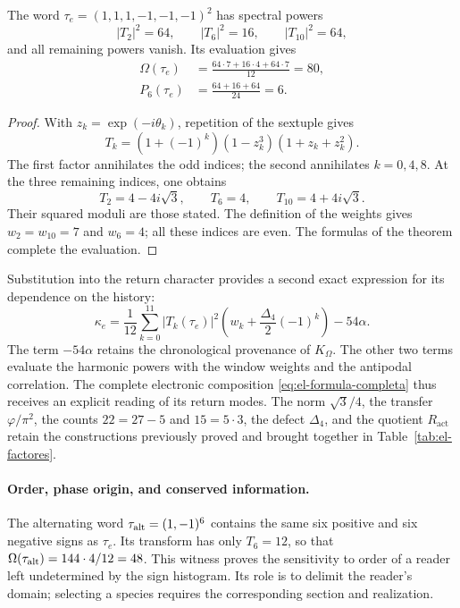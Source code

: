 \begin{corollary}
\label{cor:el-tres-modos}
The word \(\tau_e=(1,1,1,-1,-1,-1)^2\) has spectral
powers
\begin{equation}
 |T_2|^2=64,\qquad |T_6|^2=16,\qquad |T_{10}|^2=64,
 \label{eq:el-potencias-espectrales}
\end{equation}
and all remaining powers vanish. Its evaluation gives
\begin{equation}
 \begin{aligned}
 \Omega(\tau_e)&=\frac{64\cdot7+16\cdot4+64\cdot7}{12}=80,\\
 P_6(\tau_e)&=\frac{64+16+64}{24}=6.
 \end{aligned}
 \label{eq:el-evaluacion-espectral}
\end{equation}
\end{corollary}
\begin{proof}
With \(z_k=\exp(-i\theta_k)\), repetition of the sextuple gives
\[
 T_k=(1+(-1)^k)(1-z_k^3)(1+z_k+z_k^2).
\]
The first factor annihilates the odd indices; the second annihilates
\(k=0,4,8\). At the three remaining indices, one obtains
\[
 T_2=4-4i\sqrt3,\qquad T_6=4,\qquad T_{10}=4+4i\sqrt3.
\]
Their squared moduli are those stated. The definition of the
weights gives \(w_2=w_{10}=7\) and \(w_6=4\); all these indices are
even. The formulas of the theorem complete the evaluation.
\end{proof}

Substitution into the return character provides a second
exact expression for its dependence on the history:
\begin{equation}
 \kappa_e=
 \frac1{12}\sum_{k=0}^{11}|T_k(\tau_e)|^2
       \left(w_k+\frac{\Delta_4}{2}(-1)^k\right)-54\alpha.
 \label{eq:el-kappa-espectral}
\end{equation}
The term \(-54\alpha\) retains the chronological provenance
of \(K_\Omega\). The other two terms evaluate the harmonic
powers with the window weights and the antipodal
correlation. The complete electronic composition
\eqref{eq:el-formula-completa} thus receives an explicit reading
of its return modes. The norm \(\sqrt3/4\), the transfer
\(\varphi/\pi^2\), the counts \(22=27-5\) and \(15=5\cdot3\),
the defect \(\Delta_4\), and the quotient \(R_{\mathrm{act}}\)
retain the constructions previously proved and brought together in
Table~\ref{tab:el-factores}.

\paragraph{Order, phase origin, and conserved information.}
The alternating word \(\tau_{\rm alt}=(1,-1)^6\) contains the
same six positive and six negative signs as \(\tau_e\).
Its transform has only \(T_6=12\), so that
\(\Omega(\tau_{\rm alt})=144\cdot4/12=48\).
This witness proves the sensitivity to order of a reader left
undetermined by the sign histogram. Its role is to delimit
the reader's domain; selecting a species requires the
corresponding section and realization.

